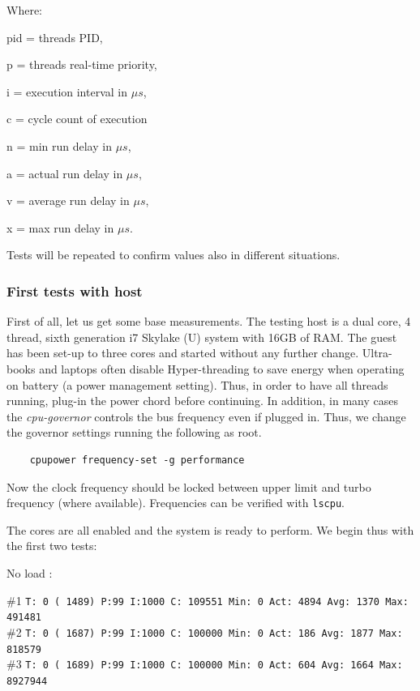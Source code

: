 \documentclass[]{scrartcl}
\begin{document}
Where:
\begin{where}
	\item[pid =] threads PID,
	\item[p =] threads real-time priority,
	\item[i =] execution interval in $\mu s$,
	\item[c =] cycle count of execution
	\item[n =] min run delay in $\mu s$,
	\item[a =] actual run delay in $\mu s$,
	\item[v =] average run delay in $\mu s$,
	\item[x =] max run delay in $\mu s$.
\end{where} 

Tests will be repeated to confirm values also in different situations.

\subsubsection{First tests with host}

First of all, let us get some base measurements. The testing host is a dual core, 4 thread, sixth generation i7 Skylake (U) system with 16GB of RAM. The guest has been set-up to three cores
and started without any further change. 
Ultra-books and laptops often disable Hyper-threading to save energy when operating on battery (a power management setting). Thus, in order to have all threads running, plug-in the power chord before continuing.
In addition, in many cases the \textit{cpu-governor} controls the bus frequency even if plugged in. Thus, we change the governor settings running the following as root. 

\begin{verbatim}
	cpupower frequency-set -g performance
\end{verbatim}

Now the clock frequency should be locked between upper limit and turbo frequency (where available). Frequencies can be verified with \texttt{lscpu}. 

The cores are all enabled and the system is ready to perform.
We begin thus with the first two tests:

\bigskip

\noindent No load :

\noindent \small \#1 \texttt{T: 0 ( 1489) P:99 I:1000 C: 109551 Min: 0 Act: 4894 Avg: 1370 Max:  491481}\\
\noindent \small \#2 \texttt{T: 0 ( 1687) P:99 I:1000 C: 100000 Min: 0 Act:  186 Avg: 1877 Max:  818579}\\
\noindent \small \#3 \texttt{T: 0 ( 1689) P:99 I:1000 C: 100000 Min: 0 Act:  604 Avg: 1664 Max:  8927944}\\
\end{document}
